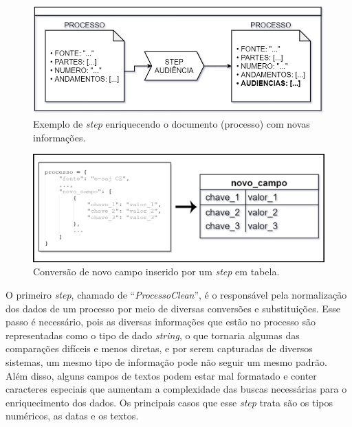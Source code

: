 \begin{figure}[ht]
\centering
\includegraphics[width=1\textwidth]{imagens/processo-in-step.png}
\caption{Exemplo de \textit{step} enriquecendo o documento (processo) com novas informações.}
\label{fig:processoInStep}
\end{figure}

\begin{figure}[ht]
\centering
\includegraphics[width=1\textwidth]{imagens/processo-para-tabela.png}
\caption{Conversão de novo campo inserido por um \textit{step} em tabela.}
\label{fig:processoParaTabela}
\end{figure}

O primeiro \textit{step}, chamado de \enquote{\textit{ProcessoClean}}, é o responsável pela normalização dos dados de um processo por meio de diversas conversões e substituições. Esse passo é necessário, pois as diversas informações que estão no processo são representadas como o tipo de dado \textit{string}, o que tornaria algumas das comparações difíceis e menos diretas, e por serem capturadas de diversos sistemas, um mesmo tipo de informação pode não seguir um mesmo padrão. Além disso, alguns campos de textos podem estar mal formatado e conter caracteres especiais que aumentam a complexidade das buscas necessárias para o enriquecimento dos dados. Os principais casos que esse \textit{step} trata são os tipos numéricos, as datas e os textos.

